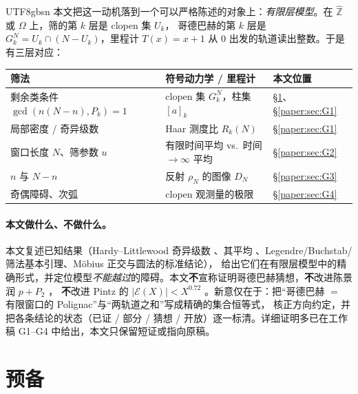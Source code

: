 \documentclass[11pt,a4paper]{article}
\newcommand{\Zhat}{\widehat{\mathbb Z}}
\newcommand{\Om}{\Omega}               %
\newcommand{\cyl}[2]{[#1]_{#2}}        %
\newcommand{\Exc}{\mathcal E}          %
\theoremstyle{plain}
\theoremstyle{definition}
\begin{document}
\begin{CJK}{UTF8}{gbsn}
本文把这一动机落到一个可以严格陈述的对象上：\emph{有限层模型}。在 $\Zhat$ 或 $\Om$ 上，筛的第 $k$ 层是 clopen 集 $U_k$，
哥德巴赫的第 $k$ 层是 $G_k^N=U_k\cap(N-U_k)$，里程计 $T(x)=x+1$ 从 $0$ 出发的轨道读出整数。于是有三层对应：
\begin{center}
\begin{tabular}{p{4.2cm}p{4.8cm}p{5.4cm}}
\hline
筛法 & 符号动力学 / 里程计 & 本文位置\\
\hline
剩余类条件 $\gcd(n(N-n),P_k)=1$ & clopen 集 $G_k^N$，柱集 $\cyl ak$ & \S\ref{paper:sec:prelim}、\S\ref{paper:sec:G1}\\
局部密度 / 奇异级数 & Haar 测度比 $R_k(N)$ & \S\ref{paper:sec:G1}\\
窗口长度 $N$、筛参数 $u$ & 有限时间平均 vs.\ 时间 $\to\infty$ 平均 & \S\ref{paper:sec:G2}\\
$n$ 与 $N-n$ & 反射 $\rho_N$ 的图像 $D_N$ & \S\ref{paper:sec:G3}\\
奇偶障碍、次弧 & clopen 观测量的极限 & \S\ref{paper:sec:G4}\\
\hline
\end{tabular}
\end{center}

\paragraph{本文做什么、不做什么。}
本文复述已知结果（Hardy--Littlewood 奇异级数 \cite{HL23}、其平均 \cite{Gal76,FG95}、Legendre/Buchstab/筛法基本引理、M\"obius 正交与圆法的标准结论），
给出它们在有限层模型中的精确形式，并定位模型\emph{不能越过}的障碍。本文\textbf{不}宣称证明哥德巴赫猜想，\textbf{不}改进陈景润 $p+P_2$ \cite{Chen73}，
\textbf{不}改进 Pintz 的 $|\Exc(X)|<X^{0.72}$ \cite{Pin18}。新意仅在于：把“哥德巴赫 $=$ 有限窗口的 Polignac”与“两轨道之和”写成精确的集合恒等式，
核正方向约定，并把各条结论的状态（已证 / 部分 / 猜想 / 开放）逐一标清。详细证明多已在工作稿 G1--G4 \cite{G1,G2,G3,G4} 中给出，本文只保留短证或指向原稿。

\section{预备}\label{paper:sec:prelim}


\end{CJK}
\end{document}
